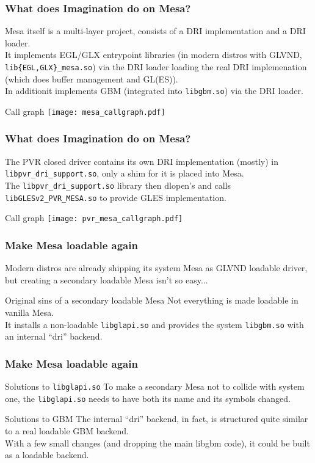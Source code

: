 \documentclass{beamer}
\begin{document}
\begin{frame}
	\frametitle{What does Imagination do on Mesa?}
	Mesa itself is a multi-layer project, consists of a DRI implementation and a DRI loader. \\
	It implements EGL/GLX entrypoint libraries (in modern distros with GLVND, \texttt{lib\{EGL,GLX\}\_mesa.so}) via the DRI loader loading the real DRI implemenation (which does buffer management and GL(ES)). \\
	In additionit implements GBM (integrated into \texttt{libgbm.so}) via the DRI loader.
	\begin{block}{Call graph}
		\texttt{[image: mesa\_callgraph.pdf]}
	\end{block}
\end{frame}

\begin{frame}
	\frametitle{What does Imagination do on Mesa?}
	The PVR closed driver contains its own DRI implementation (mostly) in \texttt{libpvr\_dri\_support.so}, only a shim for it is placed into Mesa. \\ The \texttt{libpvr\_dri\_support.so} library then dlopen's and calls \texttt{libGLESv2\_PVR\_MESA.so} to provide GLES implementation.
	\begin{block}{Call graph}
		\texttt{[image: pvr\_mesa\_callgraph.pdf]}
	\end{block}
\end{frame}

\begin{frame}
	\frametitle{Make Mesa loadable again}
	Modern distros are already shipping its system Mesa as GLVND loadable driver, but creating a secondary loadable Mesa isn't so easy...
	\begin{block}{Original sins of a secondary loadable Mesa}
		Not everything is made loadable in vanilla Mesa. \\
		It installs a non-loadable \texttt{libglapi.so} and provides the system \texttt{libgbm.so} with an internal ``dri'' backend.
	\end{block}
\end{frame}

\begin{frame}
	\frametitle{Make Mesa loadable again}
	\begin{block}{Solutions to \texttt{libglapi.so}}
		To make a secondary Mesa not to collide with system one, the \texttt{libglapi.so} needs to have both its name and its symbols changed.
	\end{block}
	\begin{block}{Solutions to GBM}
		The internal ``dri'' backend, in fact, is structured quite similar to a real loadable GBM backend. \\
		With a few small changes (and dropping the main libgbm code), it could be built as a loadable backend.
	\end{block}
\end{frame}
\end{document}
